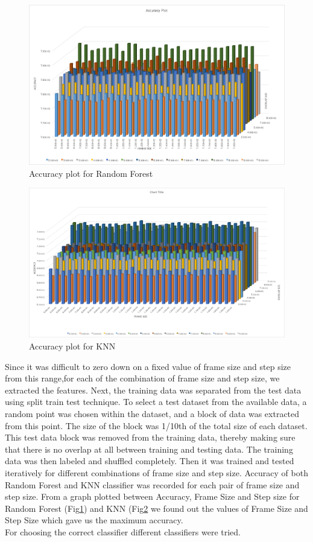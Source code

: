 \documentclass{acm_proc_article-sp}
\begin{document}
\begin{enumerate}
\begin{figure}[p]
\centering
\includegraphics[scale=0.30]{PictureRF.png}
\caption{Accuracy plot for Random Forest}
\label{fig:picRF}
\end{figure}

\begin{figure}[p]
\centering
\includegraphics[scale=0.25]{PictureKNN.png}
\caption{Accuracy plot for KNN}
\label{fig:picKNN}
\end{figure}

Since it was difficult to zero down on a fixed value of frame size and step size from this range,for each of the combination of frame size and step size, we extracted the features.
Next, the training data was separated from the test data using split train test technique. To select a test dataset from the available data, a random point was chosen within the dataset, and a block of data was extracted from this point. The size of the block was 1/10th of the total size of each dataset. This test data block was removed from the training data, thereby making sure that there is no overlap at all between training and testing data. The training data was then labeled and shuffled completely. Then it was trained and tested iteratively for different combinations of frame size and step size. Accuracy of both Random Forest and KNN classifier was recorded for each pair of frame size and step size. From a graph plotted between Accuracy, Frame Size and Step size for Random Forest (Fig\ref{fig:picRF}) and  KNN (Fig\ref{fig:picKNN} we found out the values of Frame Size and Step Size which gave us the maximum accuracy. \\
For choosing the correct classifier different classifiers were tried.



\end{enumerate}
\end{document}
